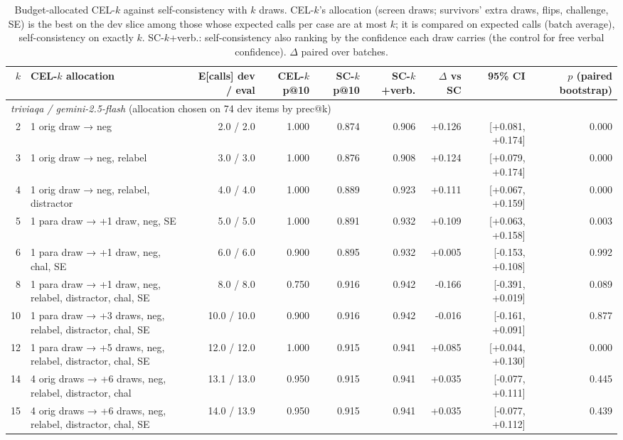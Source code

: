 \begin{table}[t]
\centering
\small
\begin{tabular}{rlrrrrrrr}
\toprule
$k$ & CEL-$k$ allocation & E[calls] dev / eval & CEL-$k$ p@10 & SC-$k$ p@10 & SC-$k$+verb. & $\Delta$ vs SC & 95\% CI & $p$ (paired bootstrap) \\
\midrule
\multicolumn{9}{l}{\emph{triviaqa / gemini-2.5-flash} (allocation chosen on 74 dev items by prec@k)} \\
2 & 1 orig draw → neg & 2.0 / 2.0 & 1.000 & 0.874 & 0.906 & +0.126 & [+0.081, +0.174] & 0.000 \\
3 & 1 orig draw → neg, relabel & 3.0 / 3.0 & 1.000 & 0.876 & 0.908 & +0.124 & [+0.079, +0.174] & 0.000 \\
4 & 1 orig draw → neg, relabel, distractor & 4.0 / 4.0 & 1.000 & 0.889 & 0.923 & +0.111 & [+0.067, +0.159] & 0.000 \\
5 & 1 para draw → +1 draw, neg, SE & 5.0 / 5.0 & 1.000 & 0.891 & 0.932 & +0.109 & [+0.063, +0.158] & 0.003 \\
6 & 1 para draw → +1 draw, neg, chal, SE & 6.0 / 6.0 & 0.900 & 0.895 & 0.932 & +0.005 & [-0.153, +0.108] & 0.992 \\
8 & 1 para draw → +1 draw, neg, relabel, distractor, chal, SE & 8.0 / 8.0 & 0.750 & 0.916 & 0.942 & -0.166 & [-0.391, +0.019] & 0.089 \\
10 & 1 para draw → +3 draws, neg, relabel, distractor, chal, SE & 10.0 / 10.0 & 0.900 & 0.916 & 0.942 & -0.016 & [-0.161, +0.091] & 0.877 \\
12 & 1 para draw → +5 draws, neg, relabel, distractor, chal, SE & 12.0 / 12.0 & 1.000 & 0.915 & 0.941 & +0.085 & [+0.044, +0.130] & 0.000 \\
14 & 4 orig draws → +6 draws, neg, relabel, distractor, chal & 13.1 / 13.0 & 0.950 & 0.915 & 0.941 & +0.035 & [-0.077, +0.111] & 0.445 \\
15 & 4 orig draws → +6 draws, neg, relabel, distractor, chal, SE & 14.0 / 13.9 & 0.950 & 0.915 & 0.941 & +0.035 & [-0.077, +0.112] & 0.439 \\
\bottomrule
\end{tabular}
\caption{Budget-allocated CEL-$k$ against self-consistency with $k$ draws. CEL-$k$'s allocation (screen draws; survivors' extra draws, flips, challenge, SE) is the best on the dev slice among those whose expected calls per case are at most $k$; it is compared on expected calls (batch average), self-consistency on exactly $k$. SC-$k$+verb.: self-consistency also ranking by the confidence each draw carries (the control for free verbal confidence). $\Delta$ paired over batches.}
\label{tab:budget_matched}
\end{table}
